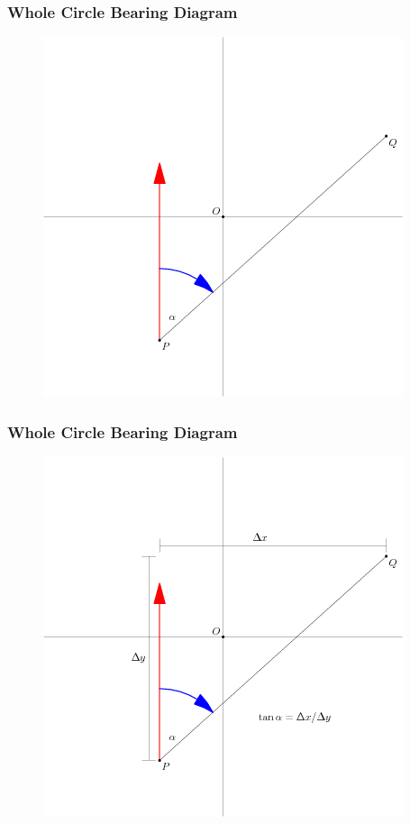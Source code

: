 \documentclass[xcolor=dvipsnames]{beamer}
\begin{document}
\begin{frame}
  \frametitle{Whole Circle Bearing Diagram}
  \begin{figure}[h]
    \includegraphics[scale=.6]{./wcbb.png}
  \end{figure}
\end{frame}

\begin{frame}
  \frametitle{Whole Circle Bearing Diagram}
  \begin{figure}[h]
    \includegraphics[scale=.6]{./wcba.png}
  \end{figure}
\end{frame}
\end{document}
